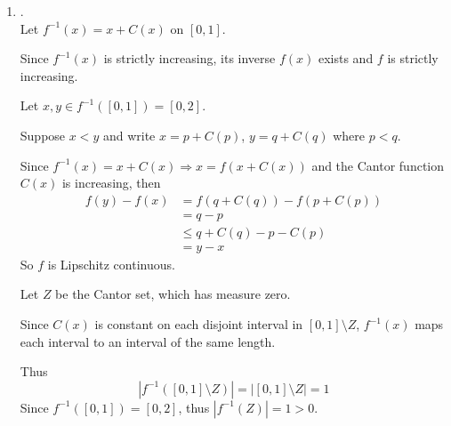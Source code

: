 \documentclass[a4paper,11pt]{article}
\begin{document}
\begin{enumerate}
\begin{enumerate}
 			\item.\\
 			Let $f^{-1} (x) = x + C(x)$ on $[0,1]$.\

 			Since $f^{-1}(x)$ is strictly increasing, its inverse $f(x)$ exists and $f$ is strictly increasing.\

 			Let $x, y \in f^{-1} ([0,1]) = [0,2]$.\

 			Suppose $x < y$ and write $x = p + C(p)$, $y = q + C(q)$ where $p < q$.\

 			Since $f^{-1}(x) = x + C(x) \Rightarrow x = f(x + C(x))$ and the Cantor function $C(x)$ is increasing, then
 				$$\begin{aligned}
 				f(y) - f(x)
 				&= f(q + C(q)) - f(p + C(p))\\
 				&= q - p\\
 				&\leq q + C(q) - p - C(p)\\
 				&= y - x
 				\end{aligned}$$
 			So $f$ is Lipschitz continuous.\

 			Let $Z$ be the Cantor set, which has measure zero.\

 			Since $C(x)$ is constant on each disjoint interval in $[0,1] \setminus Z$, $f^{-1}(x)$ maps each interval to an interval of the same length.\

 			Thus
 				$$|f^{-1}([0,1] \setminus Z)| = |[0,1] \setminus Z| = 1$$
 			Since $f^{-1}([0,1]) = [0,2]$, thus $|f^{-1}(Z)| = 1 > 0$.


 		\end{enumerate}




 \end{enumerate}
\end{document}
